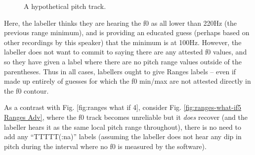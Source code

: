 \documentclass[11pt, twoside]{memoir}
\begin{document}
\begin{figure}[H]
\centering
{}
\caption{A hypothetical pitch track.%
\label{fig:ranges-what-if4 Ranges Adv}%
}
\end{figure}

Here, the labeller thinks they are hearing the f0 as all lower than 220Hz (the previous range minimum), and is providing an educated guess (perhaps based on other recordings by this speaker) that the minimum is at 100Hz. However, the labeller does not want to commit to saying there are any attested f0 values, and so they have given a label where there are no pitch range values outside of the parentheses. Thus in all cases, labellers ought to give Ranges labels – even if made up entirely of guesses for which the f0 min\slash max are not attested directly in the f0 contour.

As a contrast with Fig. [fig:ranges what if 4], consider Fig. \ref{fig:ranges-what-if5 Ranges Adv}, where the f0 track becomes unreliable but it \emph{does} recover (and the labeller hears it as the same local pitch range throughout), there is no need to add any “TTTTT(:na)” labels (assuming the labeller does not hear any dip in pitch during the interval where no f0 is measured by the software).
\end{document}
